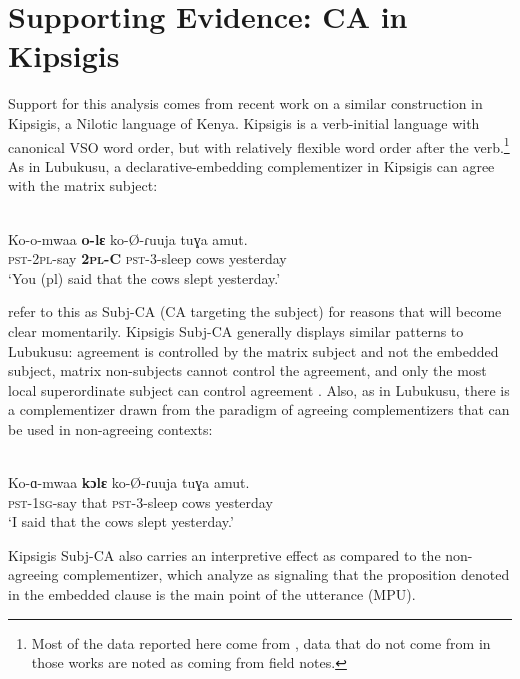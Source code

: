 \documentclass[output=paper
,modfonts
,nonflat
]{langsci/langscibook}
\begin{document}
\section{Supporting Evidence: CA in Kipsigis}\label{CA in Kipsigis}

Support for this analysis comes from recent work on a similar construction in Kipsigis, a Nilotic language of Kenya. Kipsigis is a verb-initial language with canonical VSO word order, but with relatively flexible word order after the verb.\footnote{Most of the data reported here come from \citet{Rao:2016} \citet{DiercksRao:2017}, data that do not come from in those works are noted as coming from field notes.} As in Lubukusu, a declarative-embedding complementizer in Kipsigis can agree with the matrix subject: 

\ea \label{BasicKipsigisSubj-CA}
 \\
\gll Ko-o-mwaa \textbf{o-lɛ} ko-\O-ɾuuja tuɣa amut. \\
\textsc{pst}-2\textsc{pl}-say \textbf{2\textsc{pl}-C} \textsc{pst}-3-sleep cows yesterday \\
\glt `You (pl) said that the cows slept yesterday.'

\z

\citeauthor{DiercksRao:2017} refer to this as Subj-CA (CA targeting the subject) for reasons that will become clear momentarily. Kipsigis Subj-CA generally displays similar patterns to Lubukusu: agreement is controlled by the matrix subject and not the embedded subject, matrix non-subjects cannot control the agreement, and only the most local superordinate subject can control agreement \citep{Rao:2016,DiercksRao:2017}. Also, as in Lubukusu, there is a complementizer drawn from the paradigm of agreeing complementizers that can be used in non-agreeing contexts:   

\ea \label{KipsigisNon-AgreeingCA}
 \\
\gll	Ko-ɑ-mwaa \textbf{kɔlɛ} ko-\O-ɾuuja tuɣa amut. \\
\textsc{pst}-1\textsc{sg}-say that \textsc{pst}-3-sleep cows yesterday \\
\glt `I said that the cows slept yesterday.'
\z

\noindent Kipsigis Subj-CA also carries an interpretive effect as compared to the non-agreeing complementizer, which \citet{DiercksRao:2017} analyze as signaling that the proposition denoted in the embedded clause is the main point of the utterance (MPU). 
\end{document}
